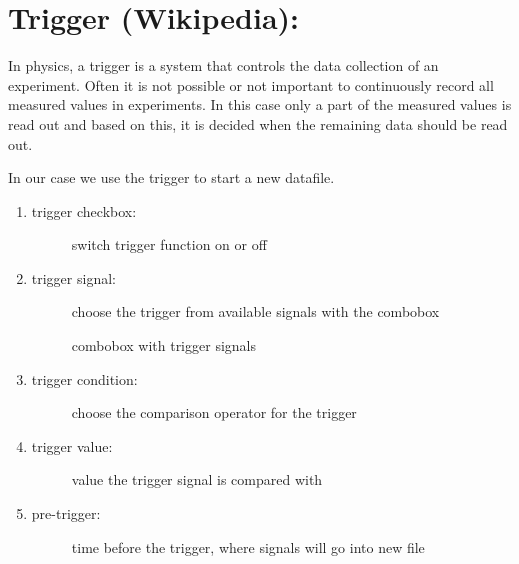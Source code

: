 \documentclass[a4paper,10pt,english]{sphinxmanual}
\begin{document}
\section{Trigger (Wikipedia):}
\label{\detokenize{trigger:trigger-wikipedia}}
In physics, a trigger is a system that controls the data collection of an experiment.
Often it is not possible or not important to continuously record all measured values
in experiments. In this case only a part of the measured values is read out and based
on this, it is decided when the remaining data should be read out.

In our case we use the trigger to start a new datafile.

\begin{enumerate}
%
\item {} \begin{description}
\item[{trigger checkbox:}] \leavevmode
switch trigger function on or off

\end{description}

\item {} \begin{description}
\item[{trigger signal:}] \leavevmode
choose the trigger from available signals with the combobox


combobox with trigger signals

\end{description}

\item {} \begin{description}
\item[{trigger condition:}] \leavevmode
choose the comparison operator for the trigger

\end{description}

\item {} \begin{description}
\item[{trigger value:}] \leavevmode
value the trigger signal is compared with

\end{description}

\item {} \begin{description}
\item[{pre-trigger:}] \leavevmode
time before the trigger, where signals will go into new file


\end{description}
\end{enumerate}
\end{document}
